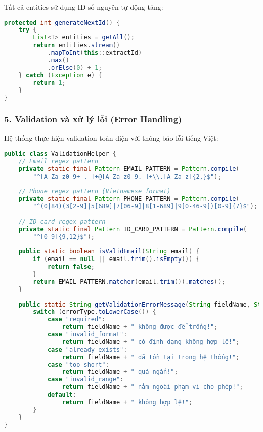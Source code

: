 \documentclass[12pt,a4paper]{article}
\begin{document}
Tất cả entities sử dụng ID số nguyên tự động tăng:

\begin{lstlisting}[language=Java, caption=ID tự động tăng trong BaseDAO]
protected int generateNextId() {
    try {
        List<T> entities = getAll();
        return entities.stream()
            .mapToInt(this::extractId)
            .max()
            .orElse(0) + 1;
    } catch (Exception e) {
        return 1;
    }
}
\end{lstlisting}

\subsubsection{5. Validation và xử lý lỗi (Error Handling)}

Hệ thống thực hiện validation toàn diện với thông báo lỗi tiếng Việt:

\begin{lstlisting}[language=Java, caption=Validation email và số điện thoại]
public class ValidationHelper {
    // Email regex pattern
    private static final Pattern EMAIL_PATTERN = Pattern.compile(
        "^[A-Za-z0-9+_.-]+@[A-Za-z0-9.-]+\\.[A-Za-z]{2,}$");
    
    // Phone regex pattern (Vietnamese format)
    private static final Pattern PHONE_PATTERN = Pattern.compile(
        "^(0|84)(3[2-9]|5[689]|7[06-9]|8[1-689]|9[0-46-9])[0-9]{7}$");
    
    // ID card regex pattern
    private static final Pattern ID_CARD_PATTERN = Pattern.compile(
        "^[0-9]{9,12}$");
    
    public static boolean isValidEmail(String email) {
        if (email == null || email.trim().isEmpty()) {
            return false;
        }
        return EMAIL_PATTERN.matcher(email.trim()).matches();
    }
    
    public static String getValidationErrorMessage(String fieldName, String errorType) {
        switch (errorType.toLowerCase()) {
            case "required":
                return fieldName + " không được để trống!";
            case "invalid_format":
                return fieldName + " có định dạng không hợp lệ!";
            case "already_exists":
                return fieldName + " đã tồn tại trong hệ thống!";
            case "too_short":
                return fieldName + " quá ngắn!";
            case "invalid_range":
                return fieldName + " nằm ngoài phạm vi cho phép!";
            default:
                return fieldName + " không hợp lệ!";
        }
    }
}
\end{lstlisting}
\end{document}
